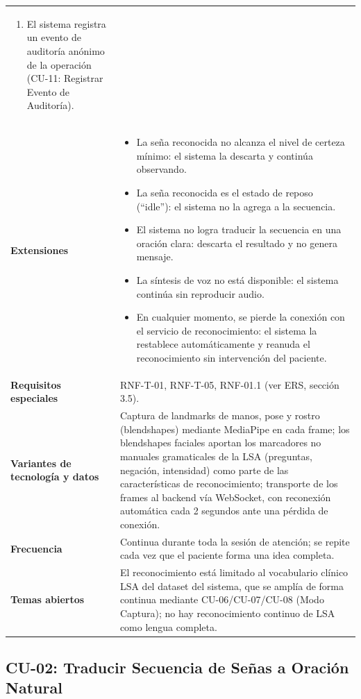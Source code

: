 \begin{longtable}{@{}>{\raggedright\arraybackslash}p{4.1cm} >{\raggedright\arraybackslash}p{\dimexpr\textwidth-4.1cm-2\tabcolsep\relax}@{}}
\begin{enumerate}[leftmargin=*, itemsep=2pt]
    \item El sistema registra un evento de auditoría anónimo de la
    operación (CU-11: Registrar Evento de Auditoría).
\end{enumerate} \\
\textbf{Extensiones} &
\begin{itemize}[leftmargin=*, itemsep=2pt]
    \item[3a.] La seña reconocida no alcanza el nivel de certeza mínimo: el
    sistema la descarta y continúa observando.
    \item[3b.] La seña reconocida es el estado de reposo (``idle''): el
    sistema no la agrega a la secuencia.
    \item[6a.] El sistema no logra traducir la secuencia en una oración
    clara: descarta el resultado y no genera mensaje.
    \item[7a.] La síntesis de voz no está disponible: el sistema continúa
    sin reproducir audio.
    \item[*a.] En cualquier momento, se pierde la conexión con el servicio
    de reconocimiento: el sistema la restablece automáticamente y reanuda
    el reconocimiento sin intervención del paciente.
\end{itemize} \\
\textbf{Requisitos especiales} & RNF-T-01, RNF-T-05, RNF-01.1 (ver ERS, sección 3.5). \\
\textbf{Variantes de tecnología y datos} &
Captura de landmarks de manos, pose y rostro (blendshapes) mediante
MediaPipe en cada frame; los blendshapes faciales aportan los marcadores no
manuales gramaticales de la LSA (preguntas, negación, intensidad) como
parte de las características de reconocimiento; transporte de los frames
al backend vía WebSocket, con reconexión automática cada 2 segundos ante
una pérdida de conexión. \\
\textbf{Frecuencia} &
Continua durante toda la sesión de atención; se repite cada vez que el
paciente forma una idea completa. \\
\textbf{Temas abiertos} &
El reconocimiento está limitado al vocabulario clínico LSA del dataset del
sistema, que se amplía de forma continua mediante CU-06/CU-07/CU-08 (Modo
Captura); no hay reconocimiento continuo de LSA como lengua completa. \\
\bottomrule
\end{longtable}

\subsection{CU-02: Traducir Secuencia de Señas a Oración Natural}

